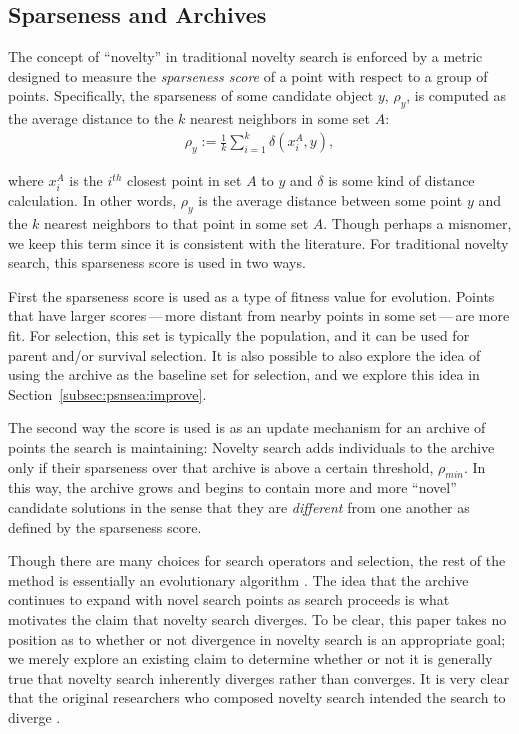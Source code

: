 \documentclass[twoside]{article}
\begin{document}
\subsection{Sparseness and Archives}
\label{subsec:sparseness}

The concept of ``novelty'' in traditional novelty search is enforced by a metric designed to measure the \emph{sparseness score} of a point with respect to a group of points.  Specifically, the sparseness of some candidate object $y$, $\rho_y$, is computed as the average distance to the $k$ nearest neighbors in some set $A$:
%
\begin{eqnarray}
  \rho_y := \frac{1}{k} \sum_{i=1}^{k} \delta\left( x^A_i, y\right),
  \label{eqn:sparseness}
\end{eqnarray}

\noindent where $x^A_i$ is the $i^{th}$ closest point in set $A$ to $y$ and $\delta$ is some kind of distance calculation.  In other words, $\rho_y$ is the average distance between some point $y$ and the $k$ nearest neighbors to that point in some set $A$.  Though perhaps a misnomer, we keep this term since it is consistent with the literature.  For traditional novelty search, this sparseness score is used in two ways.  

First the sparseness score is used as a type of fitness value for evolution.  Points that have larger scores\,---\,more distant from nearby points in some set\,---\,are more fit.  For selection, this set is typically the population, and it can be used for parent and/or survival selection.  It is also possible to also explore the idea of using the archive as the baseline set for selection, and we explore this idea in Section~\ref{subsec:psnsea:improve}.

The second way the score is used is as an update mechanism for an archive of points the search is maintaining:  Novelty search adds individuals to the archive only if their sparseness over that archive is above a certain threshold, $\rho_{min}$.  In this way, the archive grows and begins to contain more and more ``novel'' candidate solutions in the sense that they are \emph{different} from one another as defined by the sparseness score.

Though there are many choices for search operators and selection, the rest of the method is essentially an evolutionary algorithm \citep{ec:DeJong2006}.  The idea that the archive continues to expand with novel search points as search proceeds is what motivates the claim that novelty search diverges.  To be clear, this paper takes no position as to whether or not divergence in novelty search is an appropriate goal; we merely explore an existing claim to determine whether or not it is generally true that novelty search inherently diverges rather than converges.  It is very clear that the original researchers who composed novelty search intended the search to diverge \citep{Lehman2016frai,Lehman2015gecco,StanleyLehman2015}.
\end{document}
